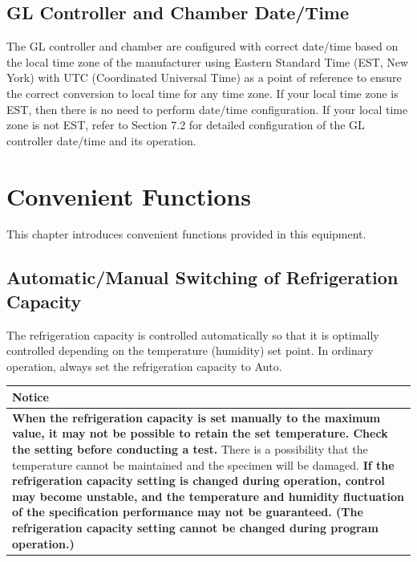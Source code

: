 \section{GL Controller and Chamber
Date/Time}

The GL controller and chamber are configured with correct date/time
based on the local time zone of the manufacturer using Eastern Standard
Time (EST, New York) with UTC (Coordinated Universal Time) as a point of
reference to ensure the correct conversion to local time for any time
zone. If your local time zone is EST, then there is no need to perform
date/time configuration. If your local time zone is not EST, refer to
Section 7.2 for detailed configuration of the GL controller date/time
and its operation.


\chapter{Convenient Functions}

This chapter introduces convenient functions provided in this equipment.


\section{Automatic/Manual Switching of Refrigeration
Capacity}

The refrigeration capacity is controlled automatically so that it is
optimally controlled depending on the temperature (humidity) set point.
In ordinary operation, always set the refrigeration capacity to Auto.

\begin{longtable}[]{@{}l@{}}
\toprule
\begin{minipage}[b]{0.97\columnwidth}\raggedright
Notice\strut
\end{minipage}\tabularnewline
\midrule
\endhead
\begin{minipage}[t]{0.97\columnwidth}\raggedright
\textbf{When the refrigeration capacity is set manually to the maximum
value, it may not be possible to retain the set temperature. Check the
setting before conducting a test.} There is a possibility that the
temperature cannot be maintained and the specimen will be damaged.
\textbf{If the refrigeration capacity setting is changed during
operation, control may become unstable, and the temperature and humidity
fluctuation of the specification performance may not be guaranteed. (The
refrigeration capacity setting cannot be changed during program
operation.)}\strut
\end{minipage}\tabularnewline
\bottomrule
\end{longtable}


